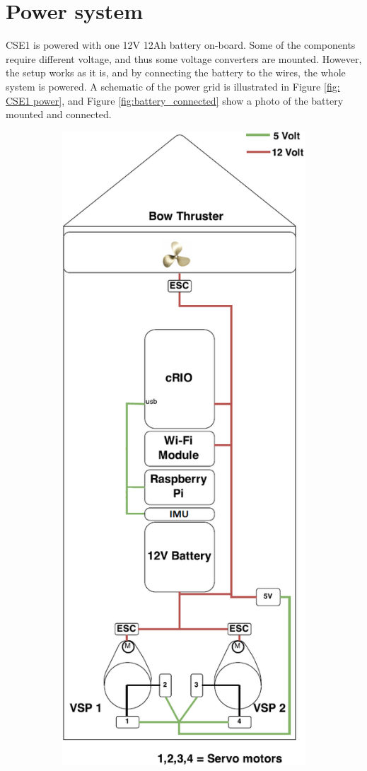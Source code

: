 \section{Power system}
CSE1 is powered with one 12V 12Ah battery on-board. Some of the components require different voltage, and thus some voltage converters are mounted. However, the setup works as it is, and by connecting the battery to the wires, the whole system is powered. A schematic of the power grid is illustrated in Figure \ref{fig: CSE1 power}, and Figure \ref{fig:battery_connected} show a photo of the battery mounted and connected. 
\begin{figure}[htb!]
\centering
\begin{subfigure}{.45\linewidth}
	\centering
	\includegraphics[height=0.4\paperheight]{fig/CSE1_power}

\end{subfigure}
\end{figure}
